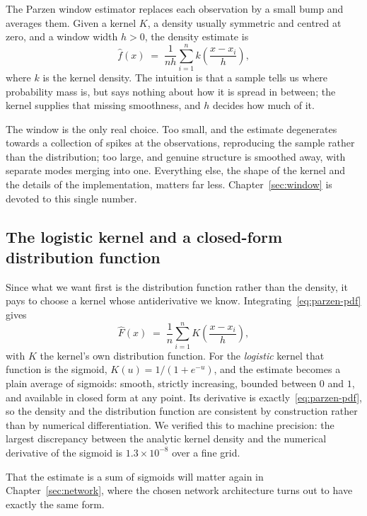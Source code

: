 \documentclass[11pt]{article}
\newcommand{\Fhat}{\widehat{F}}
\newcommand{\fhat}{\widehat{f}}
\begin{document}
The Parzen window estimator replaces each observation by a small bump and averages them.
Given a kernel $K$, a density usually symmetric and centred at zero, and a window
width $h > 0$, the density estimate is
\begin{equation}
\fhat(x) \;=\; \frac{1}{n h} \sum_{i=1}^{n} k\!\left(\frac{x - x_i}{h}\right),
\label{eq:parzen-pdf}
\end{equation}
where $k$ is the kernel density. The intuition is that a sample tells us where probability
mass is, but says nothing about how it is spread in between; the kernel supplies that missing
smoothness, and $h$ decides how much of it.

The window is the only real choice. Too small, and the estimate degenerates towards a
collection of spikes at the observations, reproducing the sample rather than the
distribution; too large, and genuine structure is smoothed away, with separate modes merging
into one. Everything else, the shape of the kernel and the details of the implementation,
matters far less. Chapter~\ref{sec:window} is devoted to this single number.

\subsection{The logistic kernel and a closed-form distribution function}

Since what we want first is the distribution function rather than the density, it pays to
choose a kernel whose antiderivative we know. Integrating~\eqref{eq:parzen-pdf} gives
\begin{equation}
\Fhat(x) \;=\; \frac{1}{n} \sum_{i=1}^{n} K\!\left(\frac{x - x_i}{h}\right),
\label{eq:parzen-cdf}
\end{equation}
with $K$ the kernel's own distribution function. For the \emph{logistic} kernel that
function is the sigmoid, $K(u) = 1/(1 + e^{-u})$, and the estimate becomes a plain average of
sigmoids: smooth, strictly increasing, bounded between $0$ and $1$, and available in closed
form at any point. Its derivative is exactly~\eqref{eq:parzen-pdf}, so the density and the
distribution function are consistent by construction rather than by numerical
differentiation. We verified this to machine precision: the largest discrepancy between the
analytic kernel density and the numerical derivative of the sigmoid is $1.3 \times 10^{-8}$
over a fine grid.

That the estimate is a sum of sigmoids will matter again in Chapter~\ref{sec:network}, where
the chosen network architecture turns out to have exactly the same form.
\end{document}
